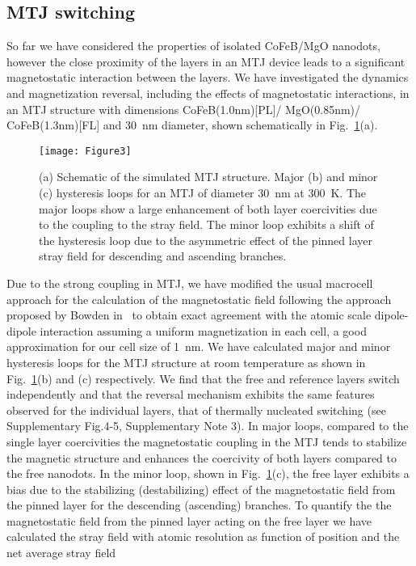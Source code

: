 \documentclass[aps,prb,signlecolumn,preprint,superscriptaddress,10]{revtex4-1}
\begin{document}
\subsection*{MTJ switching}
So far we have considered the properties of isolated CoFeB/MgO nanodots, however the close proximity of the layers in an MTJ device leads to a significant magnetostatic interaction between the layers. We have investigated the dynamics and magnetization reversal, including the effects of magnetostatic interactions, in an MTJ structure with dimensions CoFeB(1.0nm)[PL]/ MgO(0.85nm)/ CoFeB(1.3nm)[FL] and 30~nm diameter, shown schematically in Fig.~\ref{fig:MTJ_minorloop}(a). 
%
\begin{figure}[!tb]
	\centering
	\texttt{[image: Figure3]}
	\caption{(a) Schematic of the simulated MTJ structure. Major (b) and minor (c) hysteresis loops for an MTJ of diameter 30~nm at 300~K. The major loops show a large enhancement of both layer coercivities due to the coupling to the stray field. The minor loop exhibits a shift of the hysteresis loop due to the asymmetric effect of the pinned layer stray field for descending and ascending branches.}
	\label{fig:MTJ_minorloop}
\end{figure}
%
Due to the strong coupling in MTJ, we have modified the usual macrocell approach for the calculation of the magnetostatic field following the approach proposed by Bowden in~\cite{bowden} to obtain exact agreement with the atomic scale dipole-dipole interaction assuming a uniform magnetization in each cell, a good approximation for our cell size of 1~nm. We have calculated major and minor hysteresis loops for the MTJ structure at room temperature as shown in Fig.~\ref{fig:MTJ_minorloop}(b) and (c) respectively. We find that the free and reference layers switch independently and that the reversal mechanism exhibits the same features observed for the individual layers, that of thermally nucleated switching (see Supplementary Fig.4-5, Supplementary Note 3). In major loops, compared to the single layer coercivities the magnetostatic coupling in the MTJ tends to stabilize the magnetic structure and enhances the coercivity of both layers compared to the free nanodots. In the minor loop, shown in Fig.~\ref{fig:MTJ_minorloop}(c), the free layer exhibits a bias due to the stabilizing (destabilizing) effect of the magnetostatic field from the pinned layer for the descending (ascending) branches. 
To quantify the  the magnetostatic field from the pinned layer acting on the free layer we have calculated the stray field with atomic resolution as function of position and the  net average stray field 
\end{document}
